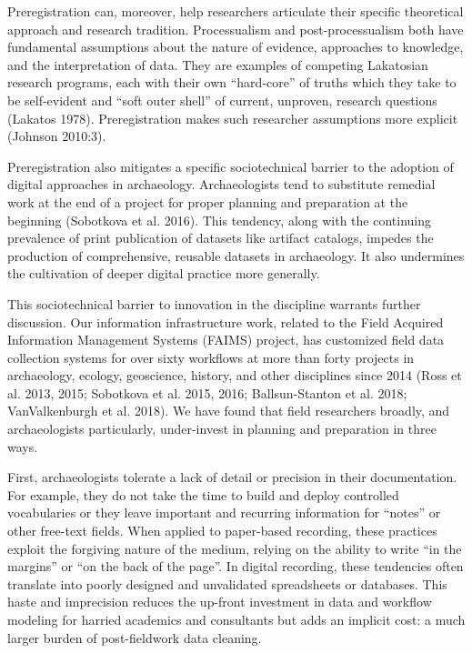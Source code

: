 \documentclass[article]{sa}
\begin{document}
Preregistration can, moreover, help researchers articulate their
specific theoretical approach and research tradition. Processualism and
post-processualism both have fundamental assumptions about the nature of
evidence, approaches to knowledge, and the interpretation of data. They
are examples of competing Lakatosian research programs, each with their
own ``hard-core'' of truths which they take to be self-evident and ``soft
outer shell'' of current, unproven, research questions (Lakatos 1978).
Preregistration makes such researcher assumptions more explicit (Johnson
2010:3).

Preregistration also mitigates a specific sociotechnical barrier to the
adoption of digital approaches in archaeology. Archaeologists tend to
substitute remedial work at the end of a project for proper planning and
preparation at the beginning (Sobotkova et al. 2016). This tendency,
along with the continuing prevalence of print publication of datasets
like artifact catalogs, impedes the production of comprehensive,
reusable datasets in archaeology. It also undermines the cultivation of
deeper digital practice more generally.

This sociotechnical barrier to innovation in the discipline warrants
further discussion. Our information infrastructure work, related to the
Field Acquired Information Management Systems (FAIMS) project, has
customized field data collection systems for over sixty workflows at
more than forty projects in archaeology, ecology, geoscience, history,
and other disciplines since 2014 (Ross et al. 2013, 2015; Sobotkova et
al. 2015, 2016; Ballsun-Stanton et al. 2018; VanValkenburgh et al.
2018). We have found that field researchers broadly, and archaeologists
particularly, under-invest in planning and preparation in three ways.

First, archaeologists tolerate a lack of detail or precision in their
documentation. For example, they do not take the time to build and
deploy controlled vocabularies or they leave important and recurring
information for ``notes'' or other free-text fields. When applied to
paper-based recording, these practices exploit the forgiving nature of
the medium, relying on the ability to write ``in the margins'' or ``on the
back of the page''. In digital recording, these tendencies often
translate into poorly designed and unvalidated spreadsheets or
databases. This haste and imprecision reduces the up-front investment in
data and workflow modeling for harried academics and consultants but
adds an implicit cost: a much larger burden of post-fieldwork data
cleaning.
\end{document}
